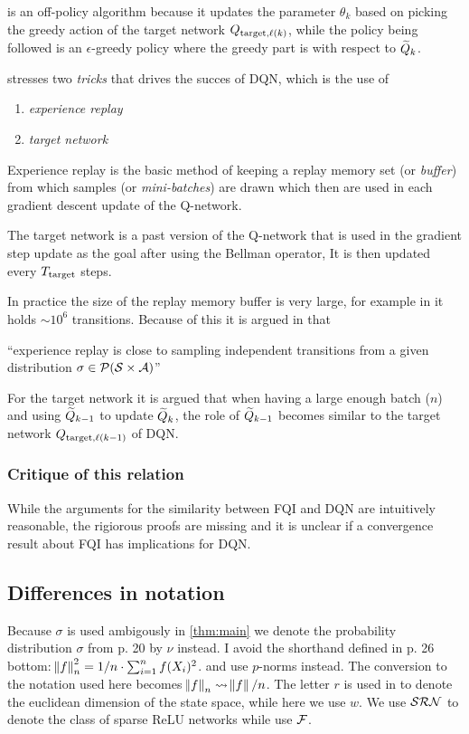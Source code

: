  is an off-policy algorithm because it updates the
parameter $\theta_k$ based on picking the greedy action of the
target network $Q_{\mathrm{target}, \ell(k)}$, while the policy being
followed is an $\epsilon$-greedy policy where the greedy part is
with respect to $\widetilde{Q}_k$.

 stresses two \emph{tricks} that drives the succes of DQN,
which is the use of
\begin{enumerate}
  \item \emph{experience replay}
  \item \emph{target network}
\end{enumerate}
Experience replay is the basic method of keeping a replay memory
set (or \emph{buffer}) from which samples (or \emph{mini-batches}) are
drawn which then are used in each gradient descent update of the
Q-network.

The target network is a past version of the Q-network that is used
in the gradient step update as the goal after using the Bellman operator,
It is then updated every $T_{\mathrm{target}}$ steps.

In practice the size of the replay memory buffer is very large, for example
in  it holds $\sim 10^6$ transitions.
Because of this it is argued in  that
\begin{displayquote}
``experience replay is close to sampling independent transitions
from a given distribution $\sigma \in \mathcal{P}(\mathcal{S} \times \mathcal{A})$''
\end{displayquote}
For the target network it is argued that when having a large enough batch
($n$) and using $\widetilde{Q}_{k-1}$ to update $\widetilde{Q}_k$, the role of
$\widetilde{Q}_{k-1}$ becomes similar to the target network
$Q_{\mathrm{target}, \ell(k-1)}$ of DQN.

\subsubsection{Critique of this relation}

While the arguments for the similarity between FQI and DQN are intuitively
reasonable, the rigiorous proofs are missing and it is unclear if
a convergence result about FQI has implications for DQN.

\subsection{Differences in notation}

Because $\sigma$ is used ambigously in \cref{thm:main}
we denote the probability distribution $\sigma$
from  p. 20 by $\nu$ instead.
I avoid the shorthand defined in
 p. 26 bottom:
$\norm{f}_n^2 = 1/n \cdot \sum_{i=1}^n f(X_i)^2$.
and use $p$-norms instead.
The conversion to the notation used here becomes
$\norm{f}_n \leadsto \norm{f}/n$.
The letter $r$ is used in  to denote the euclidean dimension of
the state space, while here we use $w$.
We use $\mathcal{SRN}$ to denote the class of sparse ReLU networks while
 use $\mathcal{F}$.


